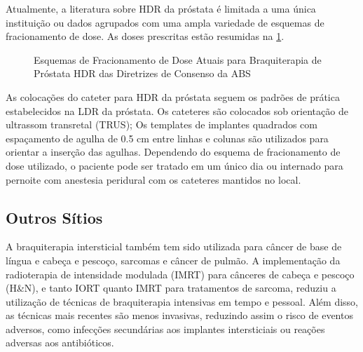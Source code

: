 \documentclass[11pt,a4paper]{article}
\begin{document}
	Atualmente, a literatura sobre HDR da próstata é limitada a uma única instituição ou dados agrupados com uma ampla variedade de esquemas de fracionamento de dose. As doses prescritas  estão resumidas na \ref{fig:esquemaFracionamentoProstata}.
	
	\begin{figure}[h]
		\centering
		\caption{Esquemas de Fracionamento de Dose Atuais para Braquiterapia de Próstata HDR das Diretrizes de Consenso da ABS}
		\label{fig:esquemaFracionamentoProstata}
	\end{figure}

	As colocações do cateter para HDR da próstata seguem os padrões de prática estabelecidos na LDR da próstata. Os cateteres são colocados sob orientação de ultrassom transretal (TRUS); Os templates de implantes quadrados com espaçamento de agulha de 0.5 cm entre linhas e colunas são utilizados para orientar a inserção das agulhas. Dependendo do esquema de fracionamento de dose utilizado, o paciente pode ser tratado em um único dia ou internado para pernoite com anestesia peridural com os cateteres mantidos no local.

\subsection*{Outros Sítios}

	A braquiterapia intersticial também tem sido utilizada para câncer de base de língua e cabeça e pescoço, sarcomas e câncer de pulmão. A implementação da radioterapia de intensidade modulada (IMRT) para cânceres de cabeça e pescoço (H\&N), e tanto IORT quanto IMRT para tratamentos de sarcoma, reduziu a utilização de técnicas de braquiterapia intensivas em tempo e pessoal. Além disso, as técnicas mais recentes são menos invasivas, reduzindo assim o risco de eventos adversos, como infecções secundárias aos implantes intersticiais ou reações adversas aos antibióticos.
\end{document}
